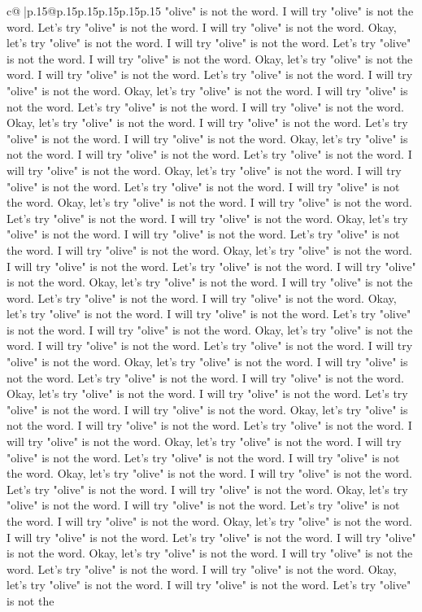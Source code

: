 \documentclass{article}
\begin{document}
{\begin{supertabular}{c@{$\;$}|p{.15\linewidth}@{}p{.15\linewidth}p{.15\linewidth}p{.15\linewidth}p{.15\linewidth}p{.15\linewidth}}
{{{"olive" is not the word. I will try "olive" is not the word. Let's try "olive" is not the word. I will try "olive" is not the word. Okay, let's try "olive" is not the word. I will try "olive" is not the word. Let's try "olive" is not the word. I will try "olive" is not the word. Okay, let's try "olive" is not the word. I will try "olive" is not the word. Let's try "olive" is not the word. I will try "olive" is not the word. Okay, let's try "olive" is not the word. I will try "olive" is not the word. Let's try "olive" is not the word. I will try "olive" is not the word. Okay, let's try "olive" is not the word. I will try "olive" is not the word. Let's try "olive" is not the word. I will try "olive" is not the word. Okay, let's try "olive" is not the word. I will try "olive" is not the word. Let's try "olive" is not the word. I will try "olive" is not the word. Okay, let's try "olive" is not the word. I will try "olive" is not the word. Let's try "olive" is not the word. I will try "olive" is not the word. Okay, let's try "olive" is not the word. I will try "olive" is not the word. Let's try "olive" is not the word. I will try "olive" is not the word. Okay, let's try "olive" is not the word. I will try "olive" is not the word. Let's try "olive" is not the word. I will try "olive" is not the word. Okay, let's try "olive" is not the word. I will try "olive" is not the word. Let's try "olive" is not the word. I will try "olive" is not the word. Okay, let's try "olive" is not the word. I will try "olive" is not the word. Let's try "olive" is not the word. I will try "olive" is not the word. Okay, let's try "olive" is not the word. I will try "olive" is not the word. Let's try "olive" is not the word. I will try "olive" is not the word. Okay, let's try "olive" is not the word. I will try "olive" is not the word. Let's try "olive" is not the word. I will try "olive" is not the word. Okay, let's try "olive" is not the word. I will try "olive" is not the word. Let's try "olive" is not the word. I will try "olive" is not the word. Okay, let's try "olive" is not the word. I will try "olive" is not the word. Let's try "olive" is not the word. I will try "olive" is not the word. Okay, let's try "olive" is not the word. I will try "olive" is not the word. Let's try "olive" is not the word. I will try "olive" is not the word. Okay, let's try "olive" is not the word. I will try "olive" is not the word. Let's try "olive" is not the word. I will try "olive" is not the word. Okay, let's try "olive" is not the word. I will try "olive" is not the word. Let's try "olive" is not the word. I will try "olive" is not the word. Okay, let's try "olive" is not the word. I will try "olive" is not the word. Let's try "olive" is not the word. I will try "olive" is not the word. Okay, let's try "olive" is not the word. I will try "olive" is not the word. Let's try "olive" is not the word. I will try "olive" is not the word. Okay, let's try "olive" is not the word. I will try "olive" is not the word. Let's try "olive" is not the word. I will try "olive" is not the word. Okay, let's try "olive" is not the word. I will try "olive" is not the word. Let's try "olive" is not the }}}
\end{supertabular}}
\end{document}
